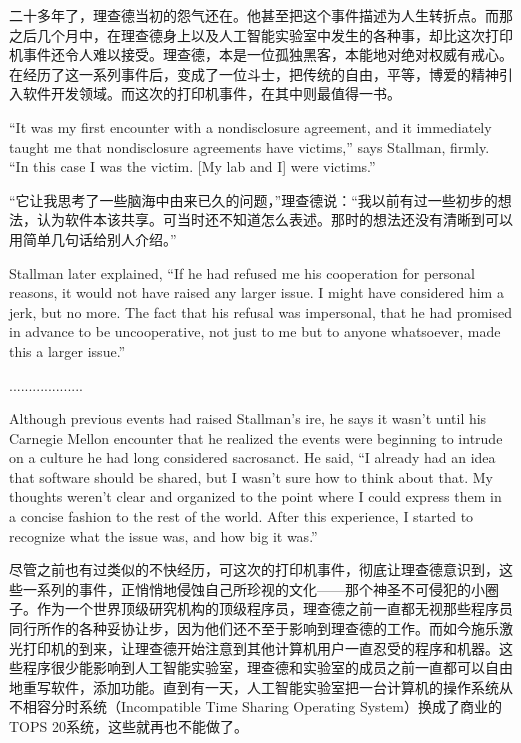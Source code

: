 \ifdefined\chs
二十多年了，理查德当初的怨气还在。他甚至把这个事件描述为人生转折点。而那之后几个月中，在理查德身上以及人工智能实验室中发生的各种事，却比这次打印机事件还令人难以接受。理查德，本是一位孤独黑客，本能地对绝对权威有戒心。在经历了这一系列事件后，变成了一位斗士，把传统的自由，平等，博爱的精神引入软件开发领域。而这次的打印机事件，在其中则最值得一书。
\fi

\ifdefined\eng
``It was my first encounter with a nondisclosure agreement, and it immediately taught me that nondisclosure agreements have victims,'' says Stallman, firmly. ``In this case I was the victim. [My lab and I] were victims.''
\fi

\ifdefined\chs
“它让我思考了一些脑海中由来已久的问题，”理查德说：“我以前有过一些初步的想法，认为软件本该共享。可当时还不知道怎么表述。那时的想法还没有清晰到可以用简单几句话给别人介绍。”
\fi

\ifdefined\eng
Stallman later explained, ``If he had refused me his cooperation for personal reasons, it would not have raised any larger issue.  I might have considered him a jerk, but no more.  The fact that his refusal was impersonal, that he had promised in advance to be uncooperative, not just to me but to anyone whatsoever, made this a larger issue.''
\fi

\ifdefined\chs
...................
\fi

\ifdefined\eng
Although previous events had raised Stallman's ire, he says it wasn't until his Carnegie Mellon encounter that he realized the events were beginning to intrude on a culture he had long considered sacrosanct.  He said, ``I already had an idea that software should be shared, but I wasn't sure how to think about that. My thoughts weren't clear and organized to the point where I could express them in a concise fashion to the rest of the world. After this experience, I started to recognize what the issue was, and how big it was.''
\fi

\ifdefined\chs
尽管之前也有过类似的不快经历，可这次的打印机事件，彻底让理查德意识到，这些一系列的事件，正悄悄地侵蚀自己所珍视的文化——那个神圣不可侵犯的小圈子。作为一个世界顶级研究机构的顶级程序员，理查德之前一直都无视那些程序员同行所作的各种妥协让步，因为他们还不至于影响到理查德的工作。而如今施乐激光打印机的到来，让理查德开始注意到其他计算机用户一直忍受的程序和机器。这些程序很少能影响到人工智能实验室，理查德和实验室的成员之前一直都可以自由地重写软件，添加功能。直到有一天，人工智能实验室把一台计算机的操作系统从不相容分时系统（Incompatible Time Sharing Operating System）换成了商业的TOPS 20系统，这些就再也不能做了。
\fi

